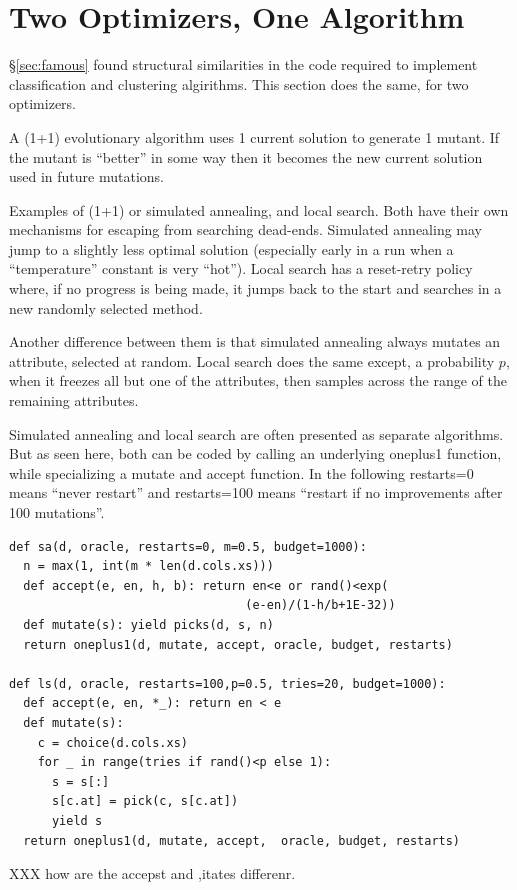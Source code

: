\section{Two Optimizers, One Algorithm}\label{sec:opt}

\S\ref{sec:famous} found structural similarities in the code required to implement
classification and clustering algirithms.
This section does the same, for two optimizers. 

A  (1+1) evolutionary algorithm uses 1 current solution
to generate 1 mutant. If the mutant is ``better'' in some way then it becomes the new current solution used in future mutations.

Examples of (1+1) or
simulated annealing, and local search.
Both have their own mechanisms for escaping from
searching dead-ends. Simulated annealing may  jump to a slightly less optimal solution (especially
early in a run when a ``temperature'' constant is very ``hot''). Local search has a reset-retry
policy where, if no progress is being made, it jumps back to the start and searches in a new
randomly selected method.

Another  difference between them is that simulated annealing always mutates an attribute, selected at random. Local search does the same except, a probability $p$, when it freezes all but one of the attributes, then samples across the range of the remaining
attributes. 

Simulated annealing and local search are often presented as separate algorithms.
But as seen here, both can be coded by calling an underlying \textsf{oneplus1} function,
while specializing a \textsf{mutate} and \textsf{accept} function. 
In the following \textsf{restarts=0} means ``never restart'' and
\textsf{restarts=100} means ``restart if no improvements after 100 mutations''.
\begin{verbatim}
def sa(d, oracle, restarts=0, m=0.5, budget=1000): 
  n = max(1, int(m * len(d.cols.xs)))
  def accept(e, en, h, b): return en<e or rand()<exp(
                                 (e-en)/(1-h/b+1E-32))
  def mutate(s): yield picks(d, s, n)
  return oneplus1(d, mutate, accept, oracle, budget, restarts)

def ls(d, oracle, restarts=100,p=0.5, tries=20, budget=1000): 
  def accept(e, en, *_): return en < e
  def mutate(s):
    c = choice(d.cols.xs)
    for _ in range(tries if rand()<p else 1):
      s = s[:]
      s[c.at] = pick(c, s[c.at])
      yield s
  return oneplus1(d, mutate, accept,  oracle, budget, restarts)
\end{verbatim}                  
 XXX how are the accepst and ,itates differenr. 

